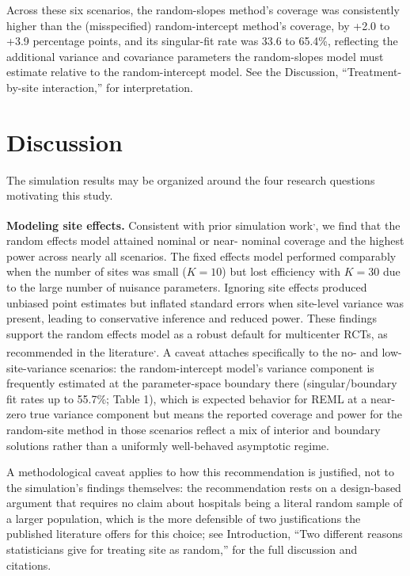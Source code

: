 \documentclass[
  11pt,
]{article}
\begin{document}
Across these six scenarios, the random-slopes method's coverage was
consistently higher than the (misspecified) random-intercept
method's coverage, by
+2.0 to
+3.9 percentage points, and
its singular-fit rate was
33.6
to
65.4\%,
reflecting the additional variance and covariance parameters the
random-slopes model must estimate relative to the random-intercept
model. See the Discussion, ``Treatment-by-site interaction,'' for
interpretation.

\section{Discussion}\label{discussion}

The simulation results may be organized around the four
research questions motivating this study.

\textbf{Modeling site effects.} Consistent with prior simulation
work\textsuperscript{,}, we find
that the random effects model attained nominal or near-
nominal coverage and the highest power across nearly all
scenarios. The fixed effects model performed comparably
when the number of sites was small (\(K = 10\)) but lost
efficiency with \(K = 30\) due to the large number of
nuisance parameters. Ignoring site effects produced
unbiased point estimates but inflated standard errors when
site-level variance was present, leading to conservative
inference and reduced power. These findings support the
random effects model as a robust default for multicenter
RCTs, as recommended in the literature\textsuperscript{,}. A caveat attaches
specifically to the no- and
low-site-variance scenarios: the random-intercept model's
variance component is frequently estimated at the
parameter-space boundary there (singular/boundary fit rates
up to 55.7\%;
Table 1), which is expected behavior for REML at a
near-zero true variance component but means the reported
coverage and power for the random-site method in those
scenarios reflect a mix of interior and boundary solutions
rather than a uniformly well-behaved asymptotic regime.

A methodological caveat applies to how this recommendation is
justified, not to the simulation's findings themselves: the
recommendation rests on a design-based argument that requires
no claim about hospitals being a literal random sample of a
larger population, which is the more defensible of two
justifications the published literature offers for this
choice; see Introduction, ``Two different reasons statisticians
give for treating site as random,'' for the full discussion and
citations.
\end{document}
